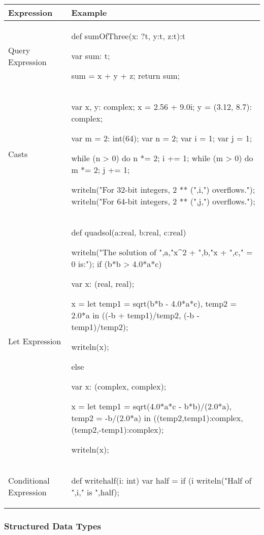 \begin{center}
\begin{longtable}{|l|l|}
\hline
{\bf Expression} & {\bf Example} \\
\hline
\endhead
\hline
\endfoot
Query Expression &
\begin{chapel} %
def sumOfThree(x: ?t, y:t, z:t):t {
   var sum: t;

   sum = x + y + z;
   return sum;
}
\end{chapel} \\
\hline
Casts &
\begin{chapel} %
var x, y: complex;
x = 2.56 + 9.0i;
y = (3.12, 8.7): complex;

var m = 2: int(64);
var n = 2;
var i = 1;
var j = 1;

while (n > 0) do {
  n *= 2;
  i += 1;
}
while (m > 0) do {
  m *= 2;
  j += 1;
}

writeln("For 32-bit integers, 2 ** (",i,") overflows.");
writeln("For 64-bit integers, 2 ** (",j,") overflows.");
\end{chapel} \\
\hline
Let Expression &
\begin{chapel} %
def quadsol(a:real, b:real, c:real) {
  writeln("The solution of ",a,"x^2 + ",b,"x + ",c," = 0 is:");
  if (b*b > 4.0*a*c) {
    var x:  (real, real);

    x = let temp1 = sqrt(b*b - 4.0*a*c), temp2 = 2.0*a in
        ((-b + temp1)/temp2, (-b - temp1)/temp2);

    writeln(x);
  } else {
    var x: (complex, complex);

    x = let temp1 = sqrt(4.0*a*c - b*b)/(2.0*a), temp2 = -b/(2.0*a) in
        ((temp2,temp1):complex,(temp2,-temp1):complex);

    writeln(x);
  }
}
\end{chapel} \\
\hline
Conditional Expression &
\begin{chapel} %
def writehalf(i: int) {
  var half = if (i %
  writeln("Half of ",i," is ",half);
}
\end{chapel} \\
\hline
\end{longtable}
\end{center}

\subsubsection{Structured Data Types}
\label{Structured_Data_Types}

